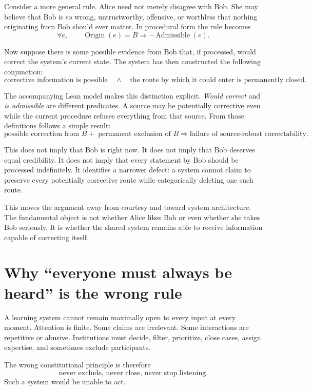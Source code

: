 \documentclass[11pt,a4paper]{article}
\begin{document}
Consider a more general rule. Alice need not merely disagree with Bob. She may believe that Bob is so wrong, untrustworthy, offensive, or worthless that nothing originating from Bob should ever matter. In procedural form the rule becomes
\[
\forall e,\qquad \operatorname{Origin}(e)=B \Rightarrow \neg\operatorname{Admissible}(e).
\]

Now suppose there is some possible evidence from Bob that, if processed, would correct the system's current state. The system has then constructed the following conjunction:
\[
\text{corrective information is possible}
\quad\land\quad
\text{the route by which it could enter is permanently closed}.
\]

The accompanying Lean model makes this distinction explicit. \emph{Would correct} and \emph{is admissible} are different predicates. A source may be potentially corrective even while the current procedure refuses everything from that source. From those definitions follows a simple result:
\[
\boxed{
\text{possible correction from }B
+\text{ permanent exclusion of }B
\Rightarrow
\text{failure of source-robust correctability}.}
\]

This does not imply that Bob is right now. It does not imply that Bob deserves equal credibility. It does not imply that every statement by Bob should be processed indefinitely. It identifies a narrower defect: a system cannot claim to preserve every potentially corrective route while categorically deleting one such route.

This moves the argument away from courtesy and toward system architecture. The fundamental object is not whether Alice likes Bob or even whether she takes Bob seriously. It is whether the shared system remains able to receive information capable of correcting itself.

\section{Why ``everyone must always be heard'' is the wrong rule}

A learning system cannot remain maximally open to every input at every moment. Attention is finite. Some claims are irrelevant. Some interactions are repetitive or abusive. Institutions must decide, filter, prioritize, close cases, assign expertise, and sometimes exclude participants.

The wrong constitutional principle is therefore
\[
\text{never exclude, never close, never stop listening.}
\]
Such a system would be unable to act.
\end{document}
